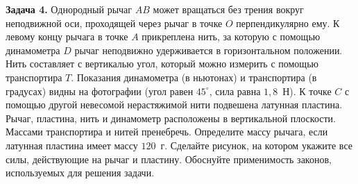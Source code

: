 \begin{taskbasic}[code={\label{task:mechanics_v4_n26}}]
\textbf{Задача 4.} Однородный рычаг $AB$ может вращаться без трения вокруг неподвижной оси, проходящей через рычаг в точке $O$ перпендикулярно ему. К левому концу рычага в точке $A$ прикреплена нить, за которую с помощью динамометра $D$ рычаг неподвижно удерживается в горизонтальном положении. Нить составляет с вертикалью угол, который можно измерить с помощью транспортира $T$. Показания динамометра (в ньютонах) и транспортира (в градусах) видны на фотографии (угол равен $45^{\circ}$, сила равна $1{,}8$~Н). К точке $C$ с помощью другой невесомой нерастяжимой нити подвешена латунная пластина. Рычаг, пластина, нить и динамометр расположены в вертикальной плоскости. Массами транспортира и нитей пренебречь. Определите массу рычага, если латунная пластина имеет массу $120$~г. Сделайте рисунок, на котором укажите все силы, действующие на рычаг и пластину. Обоснуйте применимость законов, используемых для решения задачи.

\nopagebreak\smallskip
\begin{center}
\end{center}

\end{taskbasic}

